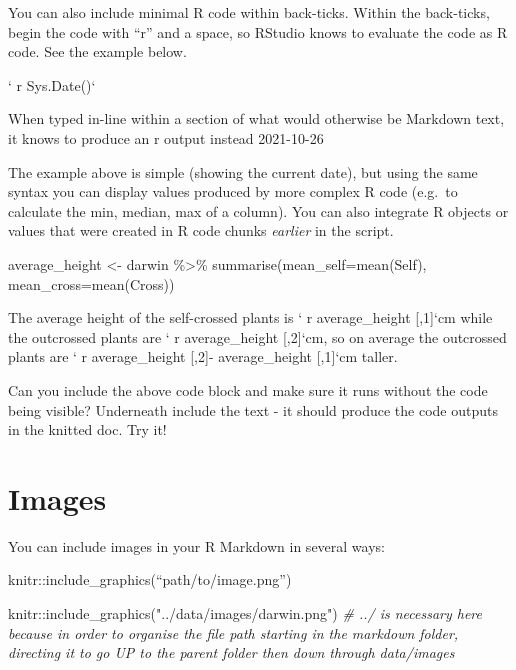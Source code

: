 \documentclass[
]{book}
\makeatletter
\newenvironment{Shaded}{\begin{snugshade}}{\end{snugshade}}
\newcommand{\AttributeTok}[1]{\textcolor[rgb]{0.77,0.63,0.00}{#1}}
\newcommand{\CommentTok}[1]{\textcolor[rgb]{0.56,0.35,0.01}{\textit{#1}}}
\newcommand{\FunctionTok}[1]{\textcolor[rgb]{0.00,0.00,0.00}{#1}}
\newcommand{\NormalTok}[1]{#1}
\newcommand{\OtherTok}[1]{\textcolor[rgb]{0.56,0.35,0.01}{#1}}
\newcommand{\SpecialCharTok}[1]{\textcolor[rgb]{0.00,0.00,0.00}{#1}}
\newcommand{\StringTok}[1]{\textcolor[rgb]{0.31,0.60,0.02}{#1}}
\newenvironment{kframe}{%
\medskip{}
\setlength{\fboxsep}{.8em}
 \def\at@end@of@kframe{}%
 \ifinner\ifhmode%
  \def\at@end@of@kframe{\end{minipage}}%
  \begin{minipage}{\columnwidth}%
 \fi\fi%
 \def\FrameCommand##1{\hskip\@totalleftmargin \hskip-\fboxsep
 \colorbox{shadecolor}{##1}\hskip-\fboxsep
     \hskip-\linewidth \hskip-\@totalleftmargin \hskip\columnwidth}%
 \MakeFramed {\advance\hsize-\width
   \@totalleftmargin\z@ \linewidth\hsize
   \@setminipage}}%
 {\par\unskip\endMakeFramed%
 \at@end@of@kframe}
\newenvironment{block}[1]
  {
  \begin{itemize}
  \renewcommand{\labelitemi}{
    \raisebox{-.7\height}[0pt][0pt]{
      {\setkeys{Gin}{width=3em,keepaspectratio}\texttt{[image: images/\#1]}}
    }
  }
  \setlength{\fboxsep}{1em}
  \begin{kframe}
  \item
  }
  {
  \end{kframe}
  \end{itemize}
  }
\newenvironment{rmdquestion}
  {\begin{block}{question}}
  {\end{block}}
\makeatother
\begin{document}
You can also include minimal R code within back-ticks. Within the back-ticks, begin the code with ``r'' and a space, so RStudio knows to evaluate the code as R code. See the example below.

` r Sys.Date()`

When typed in-line within a section of what would otherwise be Markdown text, it knows to produce an r output instead 2021-10-26

The example above is simple (showing the current date), but using the same syntax you can display values produced by more complex R code (e.g.~to calculate the min, median, max of a column). You can also integrate R objects or values that were created in R code chunks \emph{earlier} in the script.

\begin{Shaded}
\begin{Highlighting}[]
\NormalTok{average\_height }\OtherTok{\textless{}{-}}\NormalTok{ darwin }\SpecialCharTok{\%\textgreater{}\%} 
  \FunctionTok{summarise}\NormalTok{(}\AttributeTok{mean\_self=}\FunctionTok{mean}\NormalTok{(Self),}
            \AttributeTok{mean\_cross=}\FunctionTok{mean}\NormalTok{(Cross))}
\end{Highlighting}
\end{Shaded}

The average height of the self-crossed plants is ` r average\_height {[},1{]}`cm while the outcrossed plants are ` r average\_height {[},2{]}`cm, so on average the outcrossed plants are ` r average\_height {[},2{]}- average\_height {[},1{]}`cm taller.

\begin{rmdquestion}
Can you include the above code block and make sure it runs without the
code being visible? Underneath include the text - it should produce the
code outputs in the knitted doc. Try it!
\end{rmdquestion}

\hypertarget{images}{%
\section{Images}\label{images}}

You can include images in your R Markdown in several ways:

knitr::include\_graphics(``path/to/image.png'')

\begin{Shaded}
\begin{Highlighting}[]
\NormalTok{knitr}\SpecialCharTok{::}\FunctionTok{include\_graphics}\NormalTok{(}\StringTok{"../data/images/darwin.png"}\NormalTok{)}
\CommentTok{\# ../ is necessary here because in order to organise the file path starting in the markdown folder, directing it to go UP to the parent folder then down through data/images}
\end{Highlighting}
\end{Shaded}
\end{document}
